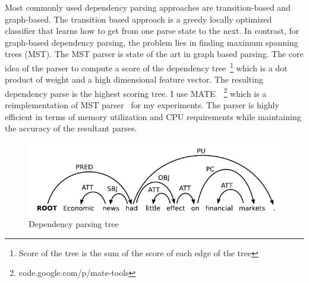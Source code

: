 Most commonly used dependency parsing approaches are transition-based and graph-based. The transition based approach is a greedy locally optimized classifier that learns how to get from one parse state to the next. %
In contrast, for graph-based dependency parsing, the problem lies in finding maximum spanning trees (MST). The MST parser is state of the art in graph based parsing. The core idea of the parser to compute a score of the dependency tree~\footnote{Score of the tree is the sum of the score of each edge of the tree} which is a dot product of weight and a high dimensional feature vector. %
The resulting dependency parse is the highest scoring tree. I use MATE~\cite{bohnet2010very}~\footnote{code.google.com/p/mate-tools} which is a reimplementation of MST parser~\cite{McDonald:2005:NDP:1220575.1220641} for my experiments. %
The parser is highly efficient in terms of memory utilization and CPU requirements while maintaining the accuracy of the resultant parses.

\begin{figure}[t]
    \centering
    \includegraphics[scale = 0.6]{figures/dep-tree.png}
    \centering
    \caption{Dependency parsing tree~\cite{kubler2009dependency}}
    \label{fig:depParsetree}
\end{figure}

